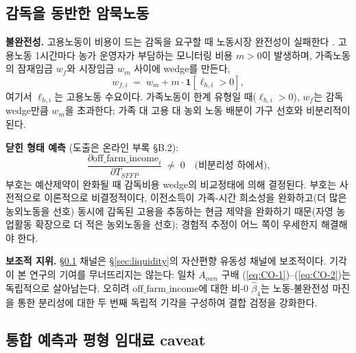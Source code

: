 \documentclass[12pt, a4paper]{article}
\begin{document}
\subsection{감독을 동반한 암묵노동}
\label{sec:supervision}

\textbf{불완전성.} 고용노동이 비용이 드는 감독을 요구할 때 노동시장 완전성이 실패한다 \citep{EswaranKotwal1986_supervision}. 고용노동 1시간마다 농가 운영자가 부담하는 모니터링 비용 $m > 0$이 발생하며, 가족노동의 잠재임금 $w_f$와 시장임금 $w_m$ 사이에 wedge를 만든다,
\begin{equation}
w_{f,i} \;=\; w_m + m \cdot \mathbf{1}[\ell_{h,i} > 0],
\label{eq:EK-wedge}
\end{equation}
여기서 $\ell_{h,i}$는 고용노동 수요이다. 가족노동이 한계 유형일 때($\ell_{h,i} > 0$), $w_f$는 감독 wedge만큼 $w_m$을 초과한다; 가족 대 고용 대 농외 노동 배분이 가구 선호와 비분리적이 된다.

\textbf{닫힌 형태 예측} (도출은 온라인 부록 \S B.2):
\begin{equation}
\boxed{\frac{\partial \text{off\_farm\_income}_i}{\partial T_{SFFP}} \;\ne\; 0 \quad \text{(비분리성 하에서),}}
\label{eq:EK-1}
\end{equation}
부호는 예산제약이 완화될 때 감독비용 wedge의 비교정태에 의해 결정된다. 부호는 사전적으로 이론적으로 비결정적이다, 이전소득이 가족-시간 희소성을 완화하고(더 많은 농외노동을 선호) 동시에 감독된 고용을 추동하는 현금 제약을 완화하기 때문(자영 농업활동 확장으로 더 적은 농외노동을 선호); 경험적 추정이 어느 쪽이 우세한지 해결해야 한다.

\textbf{보조적 지위.} \S\ref{sec:supervision} 채널은 \S\ref{sec:liquidity}의 자산편향 유동성 채널에 보조적이다. 기각이 본 연구의 기여를 무너뜨리지는 않는다: 일차 $A_{own}$ 구배 (\ref{eq:CO-1})--(\ref{eq:CO-2})는 독립적으로 살아남는다. 오히려 $\text{off\_farm\_income}$에 대한 비-0 $\hat\beta_4$는 노동-불완전성 마진을 통한 분리성에 대한 두 번째 독립적 기각을 구성하여 결합 검정을 강화한다.

\subsection{통합 예측과 평형 임대료 caveat}
\label{sec:predictions}
\end{document}
